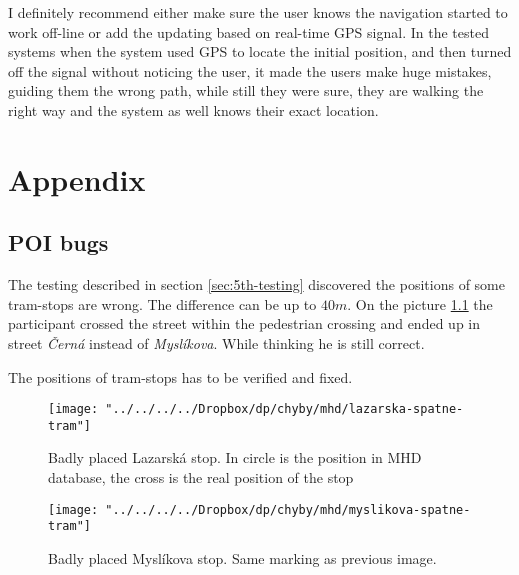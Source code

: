 \documentclass[11pt,oneside,a4paper]{book}
\begin{document}
				I definitely recommend either make sure the user knows the navigation started to work off-line or add the updating based on real-time GPS signal. In the tested systems when the system used GPS to locate the initial position, and then turned off the signal without noticing the user, it made the users make huge mistakes, guiding them the wrong path, while still they were sure, they are walking the right way and the system as well knows their exact location.
			
	
	\chapter{Appendix}
		\section{POI bugs}
			The testing described in section \ref{sec:5th-testing} discovered the positions of some tram-stops are wrong. The difference can be up to $40m$. On the picture \ref{fig:myslikova-spatne-tram} the participant crossed the street within the pedestrian crossing and ended up in street \emph{Černá} instead of \emph{Myslíkova}. While thinking he is still correct.
			
			The positions of tram-stops has to be verified and fixed.
			\begin{figure}[!htb]
				\texttt{[image: "../../../../Dropbox/dp/chyby/mhd/lazarska-spatne-tram"]}
				\caption{Badly placed Lazarská stop. In circle is the position in MHD database, the cross is the real position of the stop}\label{fig:awesome_image1}
				\endminipage\hfill
				\texttt{[image: "../../../../Dropbox/dp/chyby/mhd/myslikova-spatne-tram"]}
				\caption{Badly placed Myslíkova stop. Same marking as previous image.}\label{fig:myslikova-spatne-tram}
				\endminipage\hfill
			\end{figure}
		
		
	
	

	
	
	
	
		
	{
		\def\CS{$\cal C\kern-0.1667em\lower.5ex\hbox{$\cal S$}\kern-0.075em $}
		
	}
	
	
	
\end{document}
